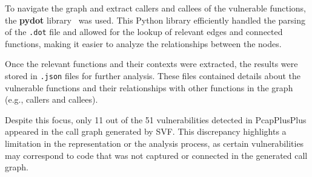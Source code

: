 To navigate the graph and extract callers and callees of the vulnerable functions, the \textbf{pydot} library~\cite{pydot} was used. This Python library efficiently handled the parsing of the \texttt{.dot} file and allowed for the lookup of relevant edges and connected functions, making it easier to analyze the relationships between the nodes.

Once the relevant functions and their contexts were extracted, the results were stored in \texttt{.json} files for further analysis. These files contained details about the vulnerable functions and their relationships with other functions in the graph (e.g., callers and callees). 

Despite this focus, only 11 out of the 51 vulnerabilities detected in PcapPlusPlus appeared in the call graph generated by SVF. This discrepancy highlights a limitation in the representation or the analysis process, as certain vulnerabilities may correspond to code that was not captured or connected in the generated call graph.
